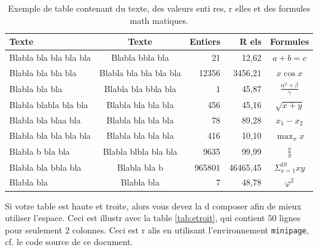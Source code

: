 \documentclass{article}
\begin{document}
\begin{table}[htb]
	\centering
	\begin{tabular}{l c r r c}
		\hline
		\rowcolor{DarkColor} 
		\textbf{Texte} 			& \textbf{Texte}			& \textbf{Entiers}	& \textbf{R els}	& \textbf{Formules}	\\ 
		\hline
		Blabla bla bla bla bla	& Blabla bbla bla			& 21 				& 12,62				& $a+b=c$								\\
		Blabla bla bla bla		& Blabla bla bla bla bla	& 12356 			& 3456,21			& $x\cos{x}$							\\
		Blabla bla bla			& Blabla bla bbla bla		& 1 				& 45,87				& $\frac{\alpha^{2}+\beta}{\gamma}$	\\
		Blabla blabla bla bla	& Blabla bla bla bla		& 456 				& 45,16				& $\sqrt{x+y}$	\\
		Blabla bla blaa bla		& Blabla bla bla bla		& 78 				& 89,28				& $x_{1}-x_{2}$	\\
		Blabla bla bla bla bla	& Blabla bla bla bla		& 416 				& 10,10				& $\max_{x}{x}$	\\
		Blabla b bla bla		& Blabla blbla bla bla		& 9635 				& 99,99				& $\frac{x}{y}$	\\
		Blabla bla bbla bla		& Blabla bla b				& 965801 			& 46465,45			& $\Sigma_{x=1}^{10}{xy}$	\\
		Blabla bla				& Blabla bla				& 7 				& 48,78				& $\varphi^2$	\\
		\hline
	\end{tabular}
	\caption{Exemple de table contenant du texte, des valeurs enti res, r elles et des formules math matiques.}
	\label{tab:exemple}
\end{table}

Si votre table est haute et  troite, alors vous devez la d composer afin de mieux utiliser l'espace. Ceci est illustr  avec la table \ref{tab:etroit}, qui contient $50$ lignes pour seulement $2$ colonnes. Ceci est r alis  en utilisant l'environnement \texttt{minipage}, cf. le code source de ce document.
	
\end{document}
